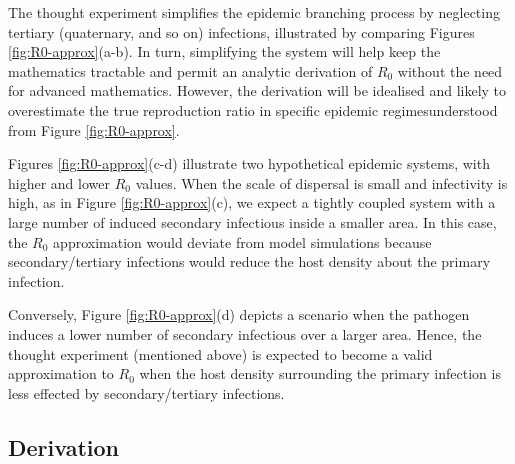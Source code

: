 The thought experiment simplifies the epidemic branching process by neglecting tertiary (quaternary, and so on) infections,
illustrated by comparing Figures \ref{fig:R0-approx}(a-b).
In turn, simplifying the system will help keep the mathematics tractable and permit an analytic derivation of $R_0$ without the need for advanced mathematics. 
However, the derivation will be idealised and likely to overestimate the true reproduction ratio in specific epidemic regimes\textemdash understood from Figure \ref{fig:R0-approx}.

Figures \ref{fig:R0-approx}(c-d) illustrate two hypothetical epidemic systems, with higher and lower $R_0$ values.
When the scale of dispersal is small and infectivity is high, as in Figure \ref{fig:R0-approx}(c), we expect a tightly coupled system with a large number of induced secondary infectious inside a smaller area. In this case, the $R_0$ approximation would deviate from model simulations because secondary/tertiary infections would reduce the host density about the primary infection. 

Conversely, Figure \ref{fig:R0-approx}(d) depicts a scenario when the pathogen induces a lower number of secondary infectious over a larger area. 
Hence, the thought experiment (mentioned above) is expected to become a valid approximation to $R_0$ when the host density surrounding the primary infection is less effected by secondary/tertiary infections. 


\subsection{Derivation}

